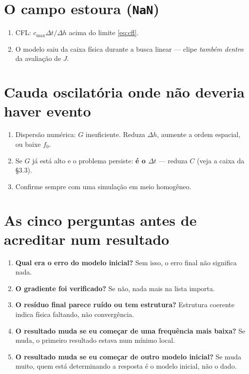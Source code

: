 \documentclass[11pt,a4paper,oneside]{report}
\begin{document}
\section{O campo estoura (\texttt{NaN})}
\begin{enumerate}[leftmargin=*]
\item CFL: $c_{\max}\Delta t/\Delta h$ acima do limite \eqref{eq:cfl}.
\item O modelo saiu da caixa f\'isica durante a busca linear --- clipe
\emph{tamb\'em dentro} da avalia\c{c}\~ao de $J$.
\end{enumerate}

\section{Cauda oscilat\'oria onde n\~ao deveria haver evento}
\begin{enumerate}[leftmargin=*]
\item Dispers\~ao num\'erica: $G$ insuficiente. Reduza $\Delta h$, aumente a
ordem espacial, ou baixe $f_0$.
\item Se $G$ j\'a est\'a alto e o problema persiste: \textbf{\'e o $\Delta t$}
--- reduza $C$ (veja a caixa da §3.3).
\item Confirme sempre com uma simula\c{c}\~ao em meio homog\^eneo.
\end{enumerate}

\section{As cinco perguntas antes de acreditar num resultado}

\begin{teoria}[]
\begin{enumerate}[leftmargin=*, itemsep=2pt]
\item \textbf{Qual era o erro do modelo inicial?} Sem isso, o erro final n\~ao
significa nada.
\item \textbf{O gradiente foi verificado?} Se n\~ao, nada mais na lista
importa.
\item \textbf{O res\'iduo final parece ru\'ido ou tem estrutura?} Estrutura
coerente indica f\'isica faltando, n\~ao converg\^encia.
\item \textbf{O resultado muda se eu come\c{c}ar de uma frequ\^encia mais
baixa?} Se muda, o primeiro resultado estava num m\'inimo local.
\item \textbf{O resultado muda se eu come\c{c}ar de outro modelo inicial?} Se
muda muito, quem est\'a determinando a resposta \'e o modelo inicial, n\~ao o
dado.
\end{enumerate}
\end{teoria}
\end{document}
